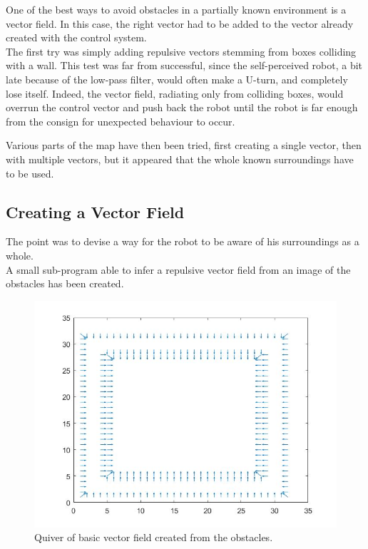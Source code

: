 One of the best ways to avoid obstacles in a partially known environment is a vector field.
In this case, the right vector had to be added to the vector already created with the control system.\\

The first try was simply adding repulsive vectors stemming from boxes colliding with a wall.
This test was far from successful, since the self-perceived robot, a bit late because of the low-pass filter, would often make a U-turn, and completely lose itself.
Indeed, the vector field, radiating only from colliding boxes,
 would overrun the control vector and push back the robot until the robot is far enough from the consign for unexpected behaviour to occur.

Various parts of the map have then been tried, first creating a single vector, then with multiple vectors, but it appeared that the whole known surroundings have to be used.

\subsection{Creating a Vector Field}
\label{vectf}

The point was to devise a way for the robot to be aware of his surroundings as a whole.\\



A small sub-program able to infer a repulsive vector field from an image of the obstacles has been created.\\

\begin{figure}[H]
\centering
\includegraphics[scale=0.4]{Figures/quiver1}
\decoRule
\caption[Basic Quiver]{Quiver of basic vector field created from the obstacles.}
\label{fig:quiver1}
\end{figure}


